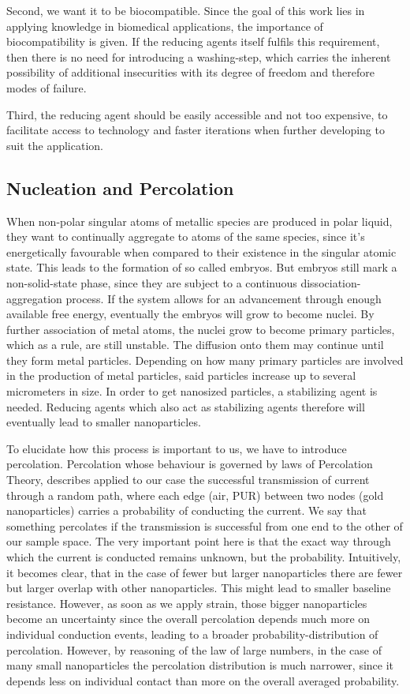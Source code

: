 Second, we want it to be biocompatible. Since the goal of this work lies in applying knowledge in biomedical applications, the importance of biocompatibility is given. If the reducing agents itself fulfils this requirement, then there is no need for introducing a washing-step, which carries the inherent possibility of additional insecurities with its degree of freedom and therefore modes of failure.


Third, the reducing agent should be easily accessible and not too expensive, to facilitate access to technology and faster iterations when further developing to suit the application.

\subsection{Nucleation and Percolation}
\label{subsec:Perc}

When non-polar singular atoms of metallic species are produced in polar liquid, they want to continually aggregate to atoms of the same species, since it's energetically favourable when compared to their existence in the singular atomic state. This leads to the formation of so called embryos.\cite{LaMer} But embryos still mark a non-solid-state phase, since they are subject to a continuous dissociation-aggregation process. If the system allows for an advancement through enough available free energy, eventually the embryos will grow to become nuclei. By further association of metal atoms, the nuclei grow to become primary particles, which as a rule, are still unstable. The diffusion onto them may continue until they form metal particles. Depending on how many primary particles are involved in the production of metal particles, said particles increase up to several micrometers in size. In order to get nanosized particles, a stabilizing agent is needed.\cite{Goia}	
Reducing agents which also act as stabilizing agents therefore will eventually lead to smaller nanoparticles. 

To elucidate how this process is important to us, we have to introduce percolation. Percolation  whose behaviour is governed by laws of Percolation Theory, describes applied to our case the successful transmission of current through a random path, where  each edge (air, PUR) between two nodes (gold nanoparticles) carries a probability of conducting the current. We say that something percolates if the transmission is successful from one end to the other of our sample space. The very important point here is that the exact way through which the current is conducted remains unknown, but the probability. Intuitively, it becomes clear, that in the case of fewer but larger nanoparticles there are fewer but larger overlap with other nanoparticles. This might lead to smaller baseline resistance. However, as soon as we apply strain, those bigger nanoparticles become an uncertainty since the overall percolation depends much more on individual conduction events, leading to a broader probability-distribution of percolation. However, by reasoning of the law of large numbers, in the case of many small nanoparticles the percolation distribution is much narrower, since it depends less on individual contact than more on the overall averaged probability.

